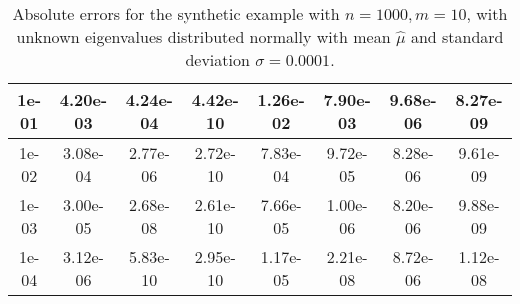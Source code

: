 \documentclass[11pt]{article}
\begin{document}
\begin{table}
\begin{adjustbox}{max width=\textwidth}
\begin{tabular}{|c|c|c|c|c|c|c|c|}
1e-01   & 4.20e-03                                                        & 4.24e-04                                                         & 4.42e-10                                                                 & 1.26e-02                                                        & 7.90e-03                                                                & 9.68e-06                                                         & 8.27e-09                                                                 \\ \hline
1e-02   & 3.08e-04                                                        & 2.77e-06                                                         & 2.72e-10                                                                 & 7.83e-04                                                        & 9.72e-05                                                                & 8.28e-06                                                         & 9.61e-09                                                                 \\ \hline
1e-03   & 3.00e-05                                                        & 2.68e-08                                                         & 2.61e-10                                                                 & 7.66e-05                                                        & 1.00e-06                                                                & 8.20e-06                                                         & 9.88e-09                                                                 \\ \hline
1e-04   & 3.12e-06                                                        & 5.83e-10                                                         & 2.95e-10                                                                 & 1.17e-05                                                        & 2.21e-08                                                                & 8.72e-06                                                         & 1.12e-08                                                                 \\ \hline
\end{tabular}
\end{adjustbox}
\caption{Absolute errors for the synthetic example with $n = 1000, m = 10$, with unknown eigenvalues distributed normally with mean $\hat{\mu}$ and standard deviation $\sigma = 0.0001$.}
\label{tbl:synt_errors_mu}
\end{table}
\end{document}
